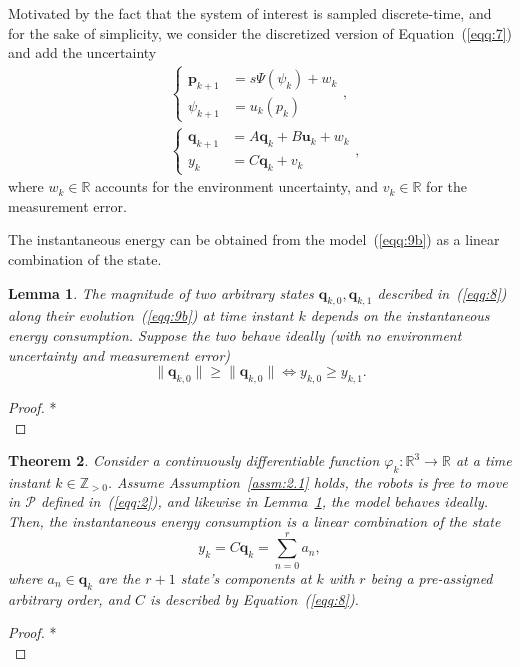 \documentclass[letterpaper,10pt,conference]{ieeeconf}
\newtheorem{thm}{Theorem}[section]
\newtheorem{lem}[thm]{Lemma}
\begin{document}
Motivated by the fact that the system of interest is sampled discrete-time, and for the sake of simplicity, we consider the discretized version of Equation~(\ref{eqq:7}) and add the uncertainty
\begin{subequations}\label{eqq:9}\begin{align}
  &\begin{cases}\label{eqq:9a}
  \mathbf{p}_{k+1}&=s\Psi(\psi_k)+w_k\\
  \psi_{k+1}&=u_k(p_k)
  \end{cases},\\
  &\begin{cases}\label{eqq:9b}
  \mathbf{q}_{k+1}&=A\mathbf{q}_{k}+B\mathbf{u}_{k}+w_k\\
  y_k&=C\mathbf{q}_k+v_k
  \end{cases},
\end{align}\end{subequations}
where $w_k\in\mathbb{R}$ accounts for the environment uncertainty, and $v_k\in\mathbb{R}$ for the measurement error.

The instantaneous energy can be obtained from the model~(\ref{eqq:9b}) as a linear combination of the state.

\begin{lem}\label{lem:2.1}
  The magnitude of two arbitrary states $\mathbf{q}_{k,0},\mathbf{q}_{k,1}$ described in~(\ref{eqq:8}) along their evolution~(\ref{eqq:9b}) at time instant $k$ depends on the instantaneous energy consumption. Suppose the two behave ideally (with no environment uncertainty and measurement error)
  \begin{equation}
    \|\mathbf{q}_{k,0}\|\geq\|\mathbf{q}_{k,0}\|\iff y_{k,0}\geq y_{k,1}.
  \end{equation}
\end{lem}
\begin{proof}
  *\\
\end{proof}

\begin{thm}\label{thm:2.2}
  Consider a continuously differentiable function $\varphi_k:\mathbb{R}^3\rightarrow\mathbb{R}$ at a time instant $k\in\mathbb{Z}_{>0}$.
  Assume Assumption~\ref{assm:2.1} holds, the robots is free to move in $\mathcal{P}$ defined in~(\ref{eqq:2}), and likewise in Lemma~\ref{lem:2.1}, the model behaves ideally. 
  Then, the instantaneous energy consumption is a linear combination of the state
  \begin{equation}
    y_k=C\mathbf{q}_k=\sum_{n=0}^r{a_n},
  \end{equation}
  where $a_n\in\mathbf{q}_k$ are the $r+1$ state's components at $k$ with $r$ being a pre-assigned arbitrary order, and $C$ is described by Equation~(\ref{eqq:8}).
\end{thm}
\begin{proof}
  *\\
\end{proof}
\end{document}
